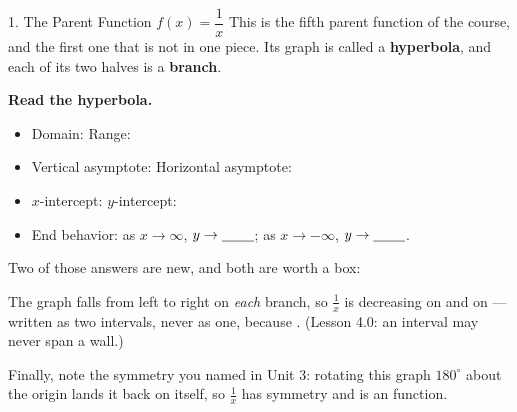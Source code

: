 \documentclass[10pt]{article}
\newcommand{\lgrid}[4]{%
  \draw[step=1, linegray!40, very thin] (#1,#3) grid (#2,#4);
  \draw[->, semithick, charcoal] (#1,0)--(#2,0) node[below right, font=\scriptsize]{$x$};
  \draw[->, semithick, charcoal] (0,#3)--(0,#4) node[left, font=\scriptsize]{$y$};}
\begin{document}
\begin{notesbox}{1. The Parent Function $f(x)=\dfrac{1}{x}$}
This is the fifth parent function of the course, and the first one that is not in one piece. Its graph is
called a \textbf{hyperbola}, and each of its two halves is a \textbf{branch}.
\begin{center}
\end{center}
\textbf{Read the hyperbola.}
\begin{itemize}[leftmargin=1.5em, itemsep=3pt]
  \item Domain: \blank{3.4cm} \quad Range: \blank{3.4cm}
  \item Vertical asymptote: \blank{1.4cm} \quad Horizontal asymptote: \blank{1.4cm}
  \item $x$-intercept: \blank{1.6cm} \quad $y$-intercept: \blank{1.6cm}
  \item End behavior: as $x\to\infty$, $y\to\blank{0.8cm}$; \; as $x\to-\infty$, $y\to\blank{0.8cm}$.
\end{itemize}

\vspace{3pt}
Two of those answers are new, and both are worth a box:

\begin{center}
\end{center}

\vspace{3pt}
The graph falls from left to right on \emph{each} branch, so $\frac1x$ is decreasing on
\blank{2.0cm} and on \blank{2.0cm} --- written as two intervals, never as one, because
\blank{4.0cm}. (Lesson 4.0: an interval may never span a wall.)

\vspace{3pt}
Finally, note the symmetry you named in Unit 3: rotating this graph $180^\circ$ about the origin lands
it back on itself, so $\frac1x$ has \blank{2.4cm} symmetry and is an \blank{1.2cm} function.
\end{notesbox}
\end{document}
